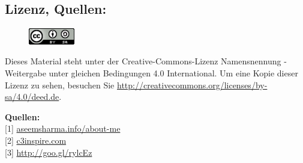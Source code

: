 \subsection*{Lizenz, Quellen:}
\begin{figure}
\includegraphics[width=2cm]{c3inspire/ccbysa88x31.png} 
\end{figure}
Dieses Material steht unter der Creative-Commons-Lizenz Namensnennung - Weitergabe unter gleichen Bedingungen 4.0 International. Um eine Kopie dieser Lizenz zu sehen, besuchen Sie \url{http://creativecommons.org/licenses/by-sa/4.0/deed.de}.

\textbf{Quellen:} \\
{[}1{]} \href{http://aseemsharma.info/about-me/aseemsharma/}{aseemsharma.info/about-me} \\
{[}2{]} \href{http://c3inspire.com}{c3inspire.com} \\
{[}3{]} \href{https://commons.wikimedia.org/wiki/User:TUBS}{http://goo.gl/rylcEz} 





